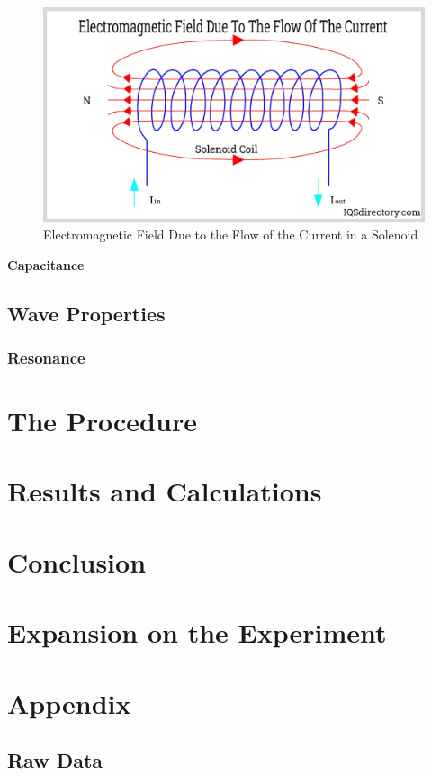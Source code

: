 \documentclass[12pt]{article}
\begin{document}
\begin{figure}[h]
    \includegraphics[width=15cm]{solenoid.jpg}
    \centering
    \caption{Electromagnetic Field Due to the Flow of the Current in a Solenoid}
    \label{fig:solenoid}
\end{figure}

\textbf{Capacitance} 

\subsection{Wave Properties}





\subsubsection{Resonance}






\section{The Procedure}



\section{Results and Calculations}



\section{Conclusion}



\section{Expansion on the Experiment}




\newpage







\newpage

\section*{Appendix}

\subsection*{Raw Data}

\listoffigures
\end{document}
